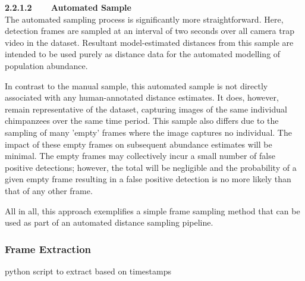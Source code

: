 \vspace{3mm}

\textbf{2.2.1.2~~~~Automated Sample}\vspace{4.5mm}\\
The automated sampling process is significantly more straightforward.
Here, detection frames are sampled at an interval of two seconds over all camera trap video in
the dataset.
Resultant model-estimated distances from this sample are intended to be used purely as distance
data for the automated modelling of population abundance.

In contrast to the manual sample, this automated sample is not directly associated with any
human-annotated distance estimates.
It does, however, remain representative of the dataset, capturing images of the same individual
chimpanzees over the same time period.
This sample also differs due to the sampling of many 'empty' frames where the image captures no
individual.
The impact of these empty frames on subsequent abundance estimates will be minimal.
The empty frames may collectively incur a small number of false positive detections; however,
the total will be negligible and the probability of a given empty frame resulting in a false
positive detection is no more likely than that of any other frame.

All in all, this approach exemplifies a simple frame sampling method that can be used as part of
an automated distance sampling pipeline.

\vspace{-2.5mm}

\subsubsection{Frame Extraction}
python script to extract based on timestamps
